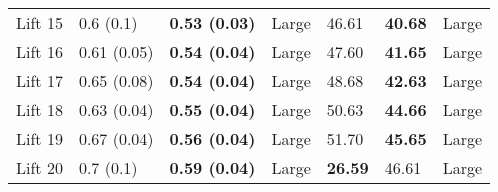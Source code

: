 \begin{tabular}{lllllll}
 Lift 15 &         0.6 (0.1) &  \textbf{0.53 (0.03)} &       Large &                   46.61 &           \textbf{40.68} &       Large \\
 Lift 16 &       0.61 (0.05) &  \textbf{0.54 (0.04)} &       Large &                   47.60 &           \textbf{41.65} &       Large \\
 Lift 17 &       0.65 (0.08) &  \textbf{0.54 (0.04)} &       Large &                   48.68 &           \textbf{42.63} &       Large \\
 Lift 18 &       0.63 (0.04) &  \textbf{0.55 (0.04)} &       Large &                   50.63 &           \textbf{44.66} &       Large \\
 Lift 19 &       0.67 (0.04) &  \textbf{0.56 (0.04)} &       Large &                   51.70 &           \textbf{45.65} &       Large \\
 Lift 20 &         0.7 (0.1) &  \textbf{0.59 (0.04)} &       Large &          \textbf{26.59} &                    46.61 &       Large \\
\bottomrule
\end{tabular}
